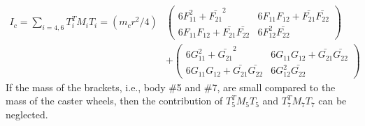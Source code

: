 \begin{align}
I_c=\sum_{i=4,6}T^T_iM_iT_i=(m_cr^2/4)&
\begin{pmatrix}
6F_{11}^2+\bar{F_{21}}^2 & 6F_{11}F_{12}+\bar{F_{21}}\bar{F_{22}}\\
6F_{11}F_{12}+\bar{F_{21}}\bar{F_{22}} & 6F_{12}^2\bar{F_22}
\end{pmatrix}\\ \nonumber
&+\begin{pmatrix}
6G_{11}^2+\bar{G_{21}}^2 & 6G_{11}G_{12}+\bar{G_{21}}\bar{G_{22}}\\
6G_{11}G_{12}+\bar{G_{21}}\bar{G_{22}} & 6G_{12}^2\bar{G_22}
\end{pmatrix}
\end{align}
If the mass of the brackets, i.e., body \#5 and \#7, are small compared to the mass of the caster wheels, then the contribution of $T^T_5M_5T_5$ and $T^T_7M_7T_7$ can be neglected.


